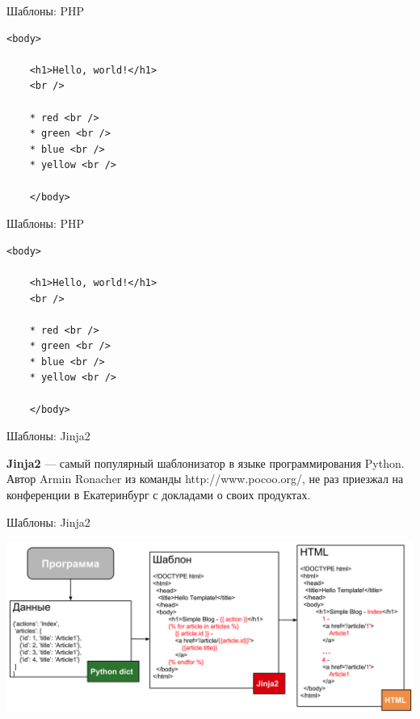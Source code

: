\begin{frame}[fragile]{Шаблоны: PHP}

  \begin{lstlisting}[style=php]
    <body>

    <h1>Hello, world!</h1>
    <br />

    * red <br />
    * green <br />
    * blue <br />
    * yellow <br />

    </body>
  \end{lstlisting}

\end{frame}

\begin{frame}[fragile]{Шаблоны: PHP}

  \begin{lstlisting}[style=php]
    <body>

    <h1>Hello, world!</h1>
    <br />

    * red <br />
    * green <br />
    * blue <br />
    * yellow <br />

    </body>
  \end{lstlisting}

\end{frame}

\begin{frame}{Шаблоны: Jinja2}

  \textbf{Jinja2} — самый популярный шаблонизатор в языке программирования
  Python. Автор Armin Ronacher из команды http://www.pocoo.org/, не раз
  приезжал на конференции в Екатеринбург с докладами о своих продуктах.

\end{frame}


\begin{frame}{Шаблоны: Jinja2}

  \begin{center}
    \includegraphics[width=\textwidth,height=\textheight,keepaspectratio]{media/template.png}
  \end{center}

\end{frame}



